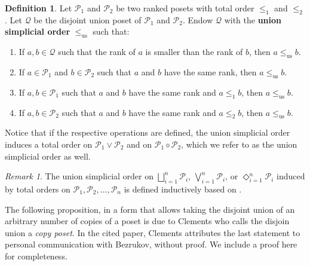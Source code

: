 \documentclass[11pt, reqno]{amsart}
\renewcommand{\P}{{\mathcal P}}
\theoremstyle{plain} %
\theoremstyle{definition}
\newtheorem{defn}[thm]{Definition}
\theoremstyle{remark}
\newtheorem{rem}[equation]{Remark}
\numberwithin{equation}{section}  %
\begin{document}
	\begin{defn}\label{defn: union simplicial order}
		Let $\mathcal{P}_1$ and $\mathcal{P}_2$ be two ranked posets  with total order $\leq_1$ and $\leq_2$.
		Let $\mathcal{Q}$ be the  disjoint union poset of $\mathcal{P}_1$ and $\mathcal{P}_2$.
	Endow $\mathcal{Q}$ with the {\bf union simplicial order} $\leq_{\text{us}}$ such that:
		\begin{enumerate}
			\item If $a,b\in \mathcal{Q}$ such that the rank of $a$ is smaller than the rank of $b$,
			then $a\leq_{\text{us}} b$.
			\item If $a\in \mathcal{P}_1$ and $b\in \mathcal{P}_2$ such that $a$ and $b$ have the same rank,
			then $a \leq_{\text{us}} b$.
			\item If $a,b\in \mathcal{P}_1$ such that $a$ and $b$ have the same rank and $a\leq_1 b$,
			then $a \leq_{\text{us}} b$.
			\item If $a,b\in \mathcal{P}_2$ such that $a$ and $b$ have the same rank and $a\leq_2 b$,
			then $a \leq_{\text{us}} b$.
		\end{enumerate}
		Notice that if the respective operations are defined, the union simplicial order induces a total order on $\mathcal{P}_1 \vee \mathcal{P}_2$ and on $\mathcal{P}_1 \diamond \mathcal{P}_2$, which we refer to as the union simplicial order as well.
	\end{defn}
	
	\begin{rem}
    The union simplicial order on $\bigsqcup_{i=1}^n \P_i$, $\bigvee_{i=1}^n \P_i$, or $\Diamond_{i=1}^n \P_i$  induced by total orders on $\P_1,\P_2,\dots,\P_n$ is defined inductively based on .
\end{rem}

The following proposition, in a form that allows taking the disjoint union of an arbitrary number of copies of a poset is due to Clements \cite[Theorem 1]{Clements} who calls the disjoin union a {\em copy poset}. In the cited paper, Clements attributes the  last statement to personal communication with Bezrukov, without proof. We include a proof  here for completeness. 
\end{document}

